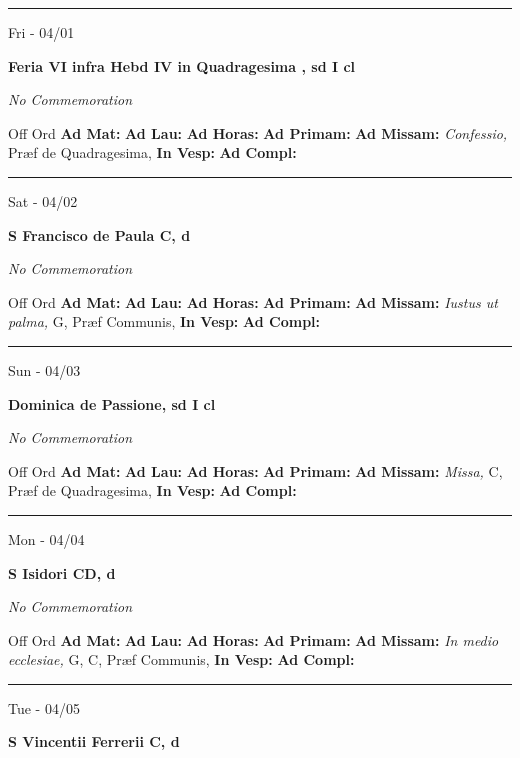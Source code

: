 \documentclass[letterpaper, 10pt]{article}
\begin{document}
\hrule
\begin{center}
Fri - 04/01
\end{center}\textbf{ \large Feria VI infra Hebd IV in Quadragesima , \textnormal{\normalsize sd I cl}}

\textit{No Commemoration}\begin{justify}
Off Ord
\textbf{Ad Mat: }
\textbf{Ad Lau: }
\textbf{Ad Horas: }
\textbf{Ad Primam: }
\textbf{Ad Missam:} \textit{Confessio, } Præf de Quadragesima, 
\textbf{In Vesp: }
\textbf{Ad Compl: }\end{justify}



\hrule
\begin{center}
Sat - 04/02
\end{center}\textbf{ \large S Francisco de Paula C, \textnormal{\normalsize d}}

\textit{No Commemoration}\begin{justify}
Off Ord
\textbf{Ad Mat: }
\textbf{Ad Lau: }
\textbf{Ad Horas: }
\textbf{Ad Primam: }
\textbf{Ad Missam:} \textit{Iustus ut palma, } G, Præf Communis, 
\textbf{In Vesp: }
\textbf{Ad Compl: }\end{justify}



\hrule
\begin{center}
Sun - 04/03
\end{center}\textbf{ \large Dominica de Passione, \textnormal{\normalsize sd I cl}}

\textit{No Commemoration}\begin{justify}
Off Ord
\textbf{Ad Mat: }
\textbf{Ad Lau: }
\textbf{Ad Horas: }
\textbf{Ad Primam: }
\textbf{Ad Missam:} \textit{Missa, } C, Præf de Quadragesima, 
\textbf{In Vesp: }
\textbf{Ad Compl: }\end{justify}



\hrule
\begin{center}
Mon - 04/04
\end{center}\textbf{ \large S Isidori CD, \textnormal{\normalsize d}}

\textit{No Commemoration}\begin{justify}
Off Ord
\textbf{Ad Mat: }
\textbf{Ad Lau: }
\textbf{Ad Horas: }
\textbf{Ad Primam: }
\textbf{Ad Missam:} \textit{In medio ecclesiae, } G, C, Præf Communis, 
\textbf{In Vesp: }
\textbf{Ad Compl: }\end{justify}



\hrule
\begin{center}
Tue - 04/05
\end{center}\textbf{ \large S Vincentii Ferrerii C, \textnormal{\normalsize d}}
\end{document}
